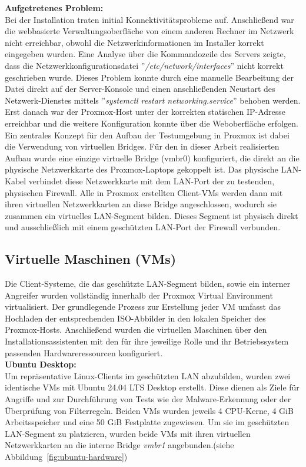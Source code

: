 \textbf{Aufgetretenes Problem:}\\
Bei der Installation  traten initial Konnektivitätsprobleme auf. Anschließend war die webbasierte Verwaltungsoberfläche von einem anderen Rechner im Netzwerk nicht erreichbar, obwohl die Netzwerkinformationen im Installer korrekt eingegeben wurden. Eine Analyse über die Kommandozeile des Servers zeigte, dass die Netzwerkkonfigurationsdatei ''\textit{/etc/network/interfaces}'' nicht korrekt geschrieben wurde. Dieses Problem konnte durch eine manuelle Bearbeitung der Datei direkt auf der Server-Konsole und einen anschließenden Neustart des Netzwerk-Dienstes mittels ''\textit{systemctl restart networking.service}'' behoben werden. Erst danach war der Proxmox-Host unter der korrekten statischen IP-Adresse erreichbar und die weitere Konfiguration konnte über die Weboberfläche erfolgen.\\

Ein zentrales Konzept für den Aufbau der Testumgebung in Proxmox ist dabei die Verwendung von virtuellen Bridges. Für den in dieser Arbeit realisierten Aufbau wurde eine einzige virtuelle Bridge (vmbr0) konfiguriert, die direkt an die physische Netzwerkkarte des Proxmox-Laptops gekoppelt ist. Das physische LAN-Kabel verbindet diese Netzwerkkarte mit dem LAN-Port der zu testenden, physischen Firewall. Alle in Proxmox erstellten Client-VMs werden dann mit ihren virtuellen Netzwerkkarten an diese Bridge angeschlossen, wodurch sie zusammen ein virtuelles LAN-Segment bilden. Dieses Segment ist physisch direkt und ausschließlich mit einem geschützten LAN-Port der Firewall verbunden.\\


\subsection{Virtuelle Maschinen (VMs)}

Die Client-Systeme, die das geschützte LAN-Segment bilden, sowie ein interner Angreifer wurden vollständig innerhalb der Proxmox Virtual Environment virtualisiert. Der grundlegende Prozess zur Erstellung jeder VM umfasst das Hochladen der entsprechenden ISO-Abbilder in den lokalen Speicher des Proxmox-Hosts. Anschließend wurden die virtuellen Maschinen über den Installationsassistenten mit den für ihre jeweilige Rolle und ihr Betriebssystem passenden Hardwareressourcen konfiguriert.\\

\textbf{Ubuntu Desktop:}\\
Um repräsentative Linux-Clients im geschützten LAN abzubilden, wurden zwei identische VMs mit Ubuntu 24.04 LTS Desktop erstellt. Diese dienen als Ziele für Angriffe und zur Durchführung von Tests wie der Malware-Erkennung oder der Überprüfung von Filterregeln. Beiden VMs wurden jeweils 4 CPU-Kerne, 4 GiB Arbeitsspeicher und eine 50 GiB Festplatte zugewiesen. Um sie im geschützten LAN-Segment zu platzieren, wurden beide VMs mit ihren virtuellen Netzwerkkarten an die interne Bridge \textit{vmbr1} angebunden.(siehe Abbildung~\ref{fig:ubuntu-hardware})\\

